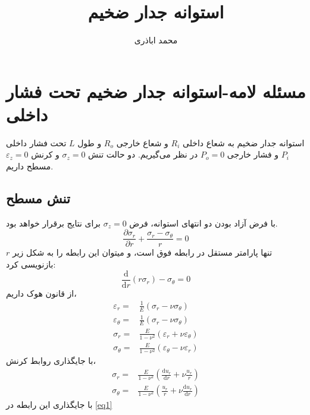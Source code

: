 \documentclass[11pt]{article} %
\title{استوانه جدار ضخیم}
\author{محمد اباذری}
\begin{document}
\maketitle
\tableofcontents
\section{مسئله لامه-استوانه جدار ضخیم تحت فشار داخلی}\label{sec_theory}
استوانه جدار ضخیم به شعاع داخلی $R_i$ و شعاع خارجی $R_o$ و طول $L$ تحت فشار داخلی $P_i$ و فشار خارجی $P_o=0$ در نظر می‌گیریم. دو حالت تنش $\sigma_z=0$ و کرنش $\varepsilon_z=0$ مسطح داریم.

\subsection{تنش مسطح}
با فرض آزاد بودن دو انتهای استوانه، فرض $\sigma_z=0$ برای نتایج برقرار خواهد بود.
\begin{equation}\nonumber
\frac{\partial\sigma_r}{\partial r}+\frac{\sigma_r-\sigma_\theta}{r}=0
\end{equation}
$r$ تنها پارامتر مستقل در رابطه فوق است، و میتوان این رابطه را به شکل زیر بازنویسی کرد:
\begin{equation}\label{eq1}
\frac{\mathrm{d}}{\mathrm{d}r}(r\sigma_r)-\sigma_\theta=0
\end{equation}
از قانون هوک\cite{hooke1678} داریم،
\begin{equation}\nonumber\begin{aligned}
\varepsilon_r =& \frac{1}{E}\left(\sigma_r-\nu\sigma_\theta\right)\\
\varepsilon_\theta =& \frac{1}{E}\left(\sigma_r-\nu\sigma_\theta\right)\\
\sigma_r =& \frac{E}{1-\nu^2}\left(\varepsilon_r+\nu\varepsilon_\theta\right)\\
\sigma_\theta =& \frac{E}{1-\nu^2}\left(\varepsilon_\theta-\nu\varepsilon_r\right)
\end{aligned}
\end{equation}
با جایگذاری روابط کرنش،
\begin{equation}\label{eq2}\begin{aligned}
\sigma_r =& \frac{E}{1-\nu^2}\left(\frac{\mathrm{d}u_r}{\mathrm{d}r}+\nu\frac{u_r}{r}\right)\\
\sigma_\theta =& \frac{E}{1-\nu^2}\left(\frac{u_r}{r}+\nu\frac{\mathrm{d}u_r}{\mathrm{d}r}\right)
\end{aligned}
\end{equation}
با جایگذاری این رابطه در \cref{eq1}
\end{document}
